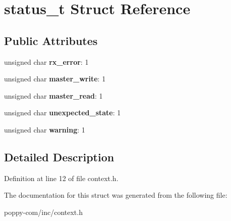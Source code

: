 \hypertarget{structstatus__t}{\section{status\-\_\-t Struct Reference}
\label{structstatus__t}
}
\subsection*{Public Attributes}
\begin{DoxyCompactItemize}
\item 
\hypertarget{structstatus__t_a05b4fada97158d7782b74b89761f802e}{unsigned char {\bfseries rx\-\_\-error}\-: 1}\label{structstatus__t_a05b4fada97158d7782b74b89761f802e}

\item 
\hypertarget{structstatus__t_a26afaab7b173abb25ef5546fdcf116a8}{unsigned char {\bfseries master\-\_\-write}\-: 1}\label{structstatus__t_a26afaab7b173abb25ef5546fdcf116a8}

\item 
\hypertarget{structstatus__t_a553cbc2843d8456e899f4a2b9ed7e7e2}{unsigned char {\bfseries master\-\_\-read}\-: 1}\label{structstatus__t_a553cbc2843d8456e899f4a2b9ed7e7e2}

\item 
\hypertarget{structstatus__t_a5093c9c2b8c9b89eaa42b71edb58b1f4}{unsigned char {\bfseries unexpected\-\_\-state}\-: 1}\label{structstatus__t_a5093c9c2b8c9b89eaa42b71edb58b1f4}

\item 
\hypertarget{structstatus__t_a2fbf2dc7cfe9e06e2bc33706e3ab6593}{unsigned char {\bfseries warning}\-: 1}\label{structstatus__t_a2fbf2dc7cfe9e06e2bc33706e3ab6593}

\end{DoxyCompactItemize}


\subsection{Detailed Description}


Definition at line 12 of file context.\-h.



The documentation for this struct was generated from the following file\-:\begin{DoxyCompactItemize}
\item 
poppy-\/com/inc/context.\-h\end{DoxyCompactItemize}
